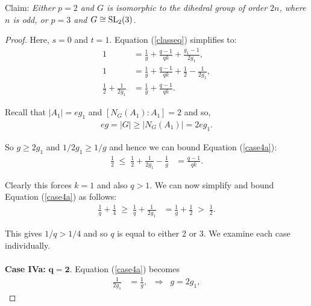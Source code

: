 \begin{theorem}[Case IV]
Claim: \textit{Either $p=2$ and $G$ is isomorphic to the dihedral group of order $2n$, where $n$ is odd, or $p=3$ and $G \cong \operatorname{SL}_2(3)$.}
\end{theorem}
\begin{proof} Here, $s = 0$ and $t = 1$. Equation (\ref{classeq}) simplifies to:
\begin{align}\label{case4a} 1 &= \frac{1}{g} + \frac{q-1}{qk} +  \frac{g_1-1}{2g_1}, \nonumber
\\ 1 &= \frac{1}{g} + \frac{q-1}{qk} + \frac{1}{2} - \frac{1}{2g_1}, \nonumber
\\ \frac{1}{2} + \frac{1}{2g_1} &= \frac{1}{g} + \frac{q-1}{qk}.
\end{align}

Recall that $|A_1|=eg_1$ and $[N_G(A_1): A_1] = 2$ and so,
\begin{align*} eg = |G| \geq |N_G(A_1)| = 2eg_1.
\end{align*}

So $g \geq 2g_1$ and $1/2g_1 \geq 1/g$ and hence we can bound Equation (\ref{case4a}):
\begin{align*} \frac{1}{2} \; \leq \; \frac{1}{2} + \frac{1}{2g_1} - \frac{1}{g} &= \frac{q-1}{qk}.
\end{align*}

Clearly this forces $k = 1$ and also $q > 1$. We can now simplify and bound Equation (\ref{case4a}) as follows:
\begin{align*} \frac{1}{q} + \frac{1}{4} \; \geq \; \frac{1}{q} + \frac{1}{2g_1} &= \frac{1}{g} + \frac{1}{2} \; > \; \frac{1}{2}. 
\end{align*}

This gives $1/q > 1/4$ and so $q$ is equal to either 2 or 3. We examine each case individually. \\
\\
 \space \textbf{Case IVa:} $\pmb{q = 2}$. Equation (\ref{case4a}) becomes
\begin{align*} \frac{1}{2g_1} &= \frac{1}{g}, \; \; \Longrightarrow \; \; g = 2g_1,
\end{align*}


\end{proof}
